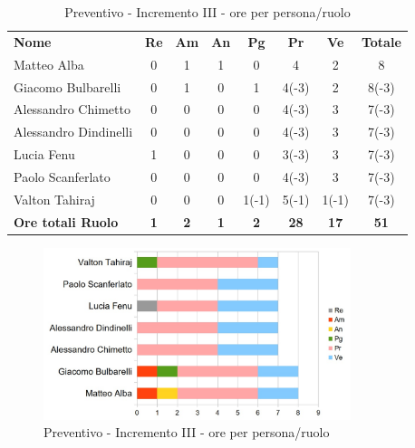 \begin{table} [h!]
	\begin{center}
		\begin{tabular} { m{3.5cm} c c c c c c c }
			\rowcolor{lightgray}
			\textbf{Nome} & \textbf{Re} & \textbf{Am} & \textbf{An} & \textbf{Pg} & \textbf{Pr} & \textbf{Ve} & \textbf{Totale} \\
			Matteo Alba & 0 & 1 & 1 & 0 & 4 & 2 & 8 \\
			Giacomo Bulbarelli & 0 & 1 & 0 & 1 & 4(-3) & 2 & 8(-3) \\
			Alessandro Chimetto & 0 & 0 & 0 & 0 & 4(-3) & 3 & 7(-3)\\
			Alessandro Dindinelli & 0 & 0 & 0 & 0 & 4(-3) & 3 & 7(-3) \\
			Lucia Fenu & 1 & 0 & 0 & 0 & 3(-3) & 3 & 7(-3) \\
			Paolo Scanferlato & 0 & 0 & 0 & 0 & 4(-3) & 3 & 7(-3) \\
			Valton Tahiraj & 0 & 0 & 0 & 1(-1) & 5(-1) & 1(-1) & 7(-3) \\
			\textbf{Ore totali Ruolo} & \textbf{1} & \textbf{2} & \textbf{1} & \textbf{2} & \textbf{28}& \textbf{17} & \textbf{51}
		\end{tabular}
		\caption{Preventivo - Incremento III - ore per persona/ruolo}
	\end{center}
\end{table}
\begin{figure} [h!]
	\centering
	\includegraphics[width=0.8\textwidth]{res/img/grafici/Incremento3Ore.jpg}
	\caption{Preventivo - Incremento III - ore per persona/ruolo} 
\end{figure}

\newpage

